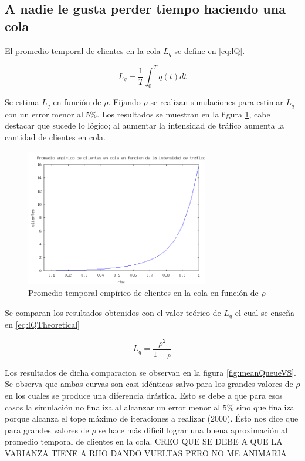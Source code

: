 \documentclass{sig-alternate}
\begin{document}
\subsection{A nadie le gusta perder tiempo haciendo una cola}
\label{sec:parte1}
El promedio temporal de clientes en la cola $L_q$ se define en \eqref{eq:lQ}.

\begin{equation}
\label{eq:lQ}
L_q = \dfrac{1}{T} \int_{0}^{T} q(t) dt
\end{equation}

Se estima $L_q$ en funci\'on de $\rho$. Fijando $\rho$ se realizan simulaciones para estimar $L_q$
con un error menor al $5\%$. Los resultados se muestran en la figura \ref{fig:meanQueue}, cabe destacar
que sucede lo l\'ogico; al aumentar la intensidad de tr\'afico aumenta la cantidad de clientes en cola.\\

\begin{figure}[ht]
\begin{center}
\includegraphics[width=8cm]{queueEmpiricVSrho}
\caption{\label{fig:meanQueue} Promedio temporal emp\'irico de clientes en la cola en funci\'on de $\rho$}
\end{center}
\end{figure}

Se comparan los resultados obtenidos con el valor te\'orico de $L_q$ el cual se ense\~na en \eqref{eq:lQTheoretical}

\begin{equation}
\label{eq:lQTheoretical}
L_q = \dfrac{\rho^{2}}{1 - \rho}
\end{equation}

Los resultados de dicha comparacion se observan en la figura \ref{fig:meanQueueVS}. Se observa que ambas curvas
son casi id\'enticas salvo para los grandes valores de $\rho$ en los cuales se produce una diferencia dr\'astica.
Esto se debe a que para esos casos la simulaci\'on no finaliza al alcanzar un error menor al $5\%$ sino que finaliza
porque alcanza el tope m\'aximo de iteraciones a realizar ($2000$). \'Esto nos dice que para grandes valores de $\rho$
se hace m\'as dif\'icil lograr una buena aproximaci\'on al promedio temporal de clientes en la cola.
CREO QUE SE DEBE A QUE LA VARIANZA TIENE A RHO DANDO VUELTAS PERO NO ME ANIMARIA
\end{document}
